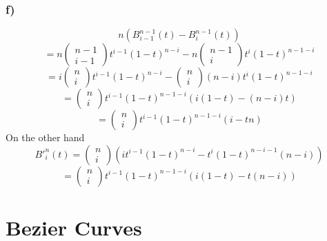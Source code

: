 \subsubsection{f)}
\[
    n \left( B _{ i-1 }^{ n-1 } (t) - B _{ i }^{ n-1 } (t)\right) 
\]
\[
= n \begin{pmatrix*}
     n-1 \\
     i-1 
\end{pmatrix*}
t^{i-1} \left( 1-t\right) ^{n-i} - n \begin{pmatrix*}
    n-1 \\
     i 
\end{pmatrix*}
t^i \left( 1-t\right) ^{n-1-i} 
\]
\[
= i \begin{pmatrix*}
     n \\
     i 
\end{pmatrix*}
t^{i-1} \left( 1-t\right) ^{n-i} -  \begin{pmatrix*}
    n \\
     i 
\end{pmatrix*}\left( n-i \right) 
t^i \left( 1-t\right) ^{n-1-i} 
\]
\[
=  \begin{pmatrix*}
     n \\
     i 
\end{pmatrix*}
t^{i-1} \left( 1-t\right) ^{n-1-i} 
\left( i\left( 1-t\right) - \left( n-i\right) t\right)          
\]
\[
= \begin{pmatrix*}
    n  \\
    i 
\end{pmatrix*}
t ^{i-1} \left( 1-t\right) ^{n-1-i} \left( i-tn \right) 
\]
On the other hand 
\[
    B' _{ i }^{ n  } (t) = \begin{pmatrix*}
         n \\
         i 
    \end{pmatrix*}
    \left( it^{i-1} \left( 1-t \right) ^{n-i} - t^i \left( 1-t\right) ^{n-i-1} \left(
    n-i\right) \right) 
\]
\[
= \begin{pmatrix*}
     n \\
     i 
\end{pmatrix*}
t^{i-1} \left( 1-t\right) ^{n-1-i} \left( i\left( 1-t\right) -t\left( n-i\right) \right) 
\]

\section{Bezier Curves}
\label{sec:Bezier Curves}
